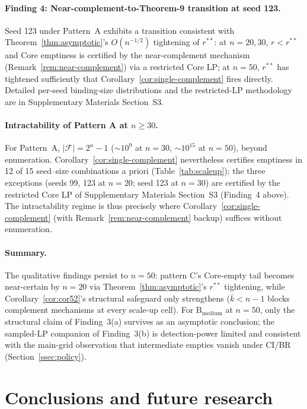 \documentclass[11pt]{article}
\theoremstyle{plain}
\theoremstyle{definition}
\theoremstyle{remark}
\newcommand{\F}{\mathcal{F}}
\begin{document}
\paragraph{Finding 4: Near-complement-to-Theorem-9 transition at seed 123.} Seed 123 under Pattern~A exhibits a transition consistent with Theorem~\ref{thm:asymptotic}'s $O(n^{-1/2})$ tightening of $r^{\ast\ast}$: at $n=20,30$, $r<r^{\ast\ast}$ and Core emptiness is certified by the near-complement mechanism (Remark~\ref{rem:near-complement}) via a restricted Core LP; at $n=50$, $r^{\ast\ast}$ has tightened sufficiently that Corollary~\ref{cor:single-complement} fires directly. Detailed per-seed binding-size distributions and the restricted-LP methodology are in Supplementary Materials Section~S3.

\paragraph{Intractability of Pattern A at $n\ge 30$.} For Pattern~A, $|\F|=2^n-1$ ($\sim 10^9$ at $n=30$, $\sim 10^{15}$ at $n=50$), beyond enumeration. Corollary~\ref{cor:single-complement} nevertheless certifies emptiness in 12 of 15 seed--size combinations a priori (Table~\ref{tab:scaleup}); the three exceptions (seeds 99, 123 at $n=20$; seed 123 at $n=30$) are certified by the restricted Core LP of Supplementary Materials Section~S3 (Finding~4 above). The intractability regime is thus precisely where Corollary~\ref{cor:single-complement} (with Remark~\ref{rem:near-complement} backup) suffices without enumeration.

\paragraph{Summary.} The qualitative findings persist to $n=50$: pattern C's Core-empty tail becomes near-certain by $n=20$ via Theorem~\ref{thm:asymptotic}'s $r^{\ast\ast}$ tightening, while Corollary~\ref{cor:cor52}'s structural safeguard only strengthens ($\bar k<n-1$ blocks complement mechanisms at every scale-up cell). For $\text{B}_{\text{medium}}$ at $n=50$, only the structural claim of Finding~3(a) survives as an asymptotic conclusion; the sampled-LP companion of Finding~3(b) is detection-power limited and consistent with the main-grid observation that intermediate empties vanish under CI/BR (Section~\ref{ssec:policy}).

\section{Conclusions and future research}
\label{sec:conclusion}
\end{document}
